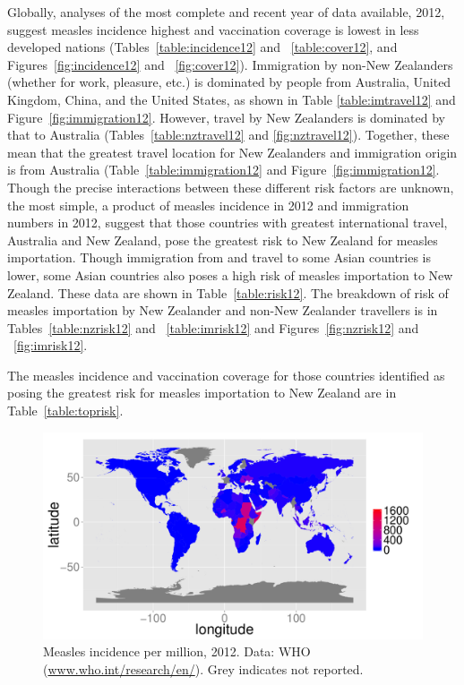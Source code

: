\documentclass{article}
\begin{document}
Globally, analyses of the most complete and recent year of data available, 2012, suggest measles incidence highest  and vaccination coverage is lowest in less developed nations (Tables~\autoref{table:incidence12} and ~\autoref{table:cover12}, and Figures~\autoref{fig:incidence12} and ~\autoref{fig:cover12}). Immigration by non-New Zealanders (whether for work, pleasure, etc.) is dominated by people from Australia, United Kingdom, China, and the United States, as shown in Table \autoref{table:imtravel12} and Figure~\autoref{fig:immigration12}. However, travel by New Zealanders is dominated by that to Australia (Tables~\autoref{table:nztravel12} and \autoref{fig:nztravel12}). Together, these mean that the greatest travel location for New Zealanders and immigration origin is from Australia (Table~\autoref{table:immigration12} and Figure~\autoref{fig:immigration12}. Though the precise interactions between these different risk factors are unknown, the most simple, a product of measles incidence in 2012 and immigration numbers in 2012, suggest that those countries with greatest international travel, Australia and New Zealand, pose the greatest risk to New Zealand for measles importation. Though immigration from and travel to some Asian countries is lower, some Asian countries also poses a high risk of measles importation to New Zealand. These data are shown in Table~\autoref{table:risk12}. The breakdown of risk of measles importation by New Zealander and non-New Zealander travellers is in Tables~\autoref{table:nzrisk12} and ~\autoref{table:imrisk12} and Figures~\autoref{fig:nzrisk12} and ~\autoref{fig:imrisk12}. 

The measles incidence and vaccination coverage for those countries identified as posing the greatest risk for measles importation to New Zealand are in Table~\autoref{table:toprisk}.


\begin{figure}
\begin{center}
\includegraphics{draftfinalreport-037}
\end{center}
\caption{Measles incidence per million, 2012. Data: WHO (\href{http://www.who.int/research/en/}{www.who.int/research/en/}). Grey indicates not reported.}
\label{fig:incidence12}
\end{figure}
\end{document}

